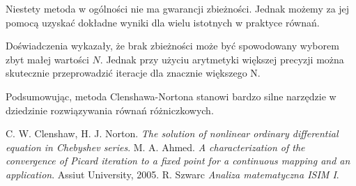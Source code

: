 \documentclass{article}
\begin{document}
\par Niestety metoda w ogólności nie ma gwarancji zbieżności. Jednak możemy za jej pomocą uzyskać dokładne wyniki dla wielu istotnych w praktyce równań. 

\par Doświadczenia wykazały, że brak zbieżności może być spowodowany wyborem zbyt małej wartości $N$. Jednak przy użyciu arytmetyki większej precyzji można skutecznie przeprowadzić iteracje dla znacznie większego N.

\par Podsumowując, metoda Clenshawa-Nortona stanowi bardzo silne narzędzie w dziedzinie rozwiązywania równań różniczkowych.


\begin{thebibliography}{100}
 C. W. Clenshaw, H. J. Norton. \emph{The solution of nonlinear ordinary differential equation in Chebyshev series}. 
 M. A. Ahmed. \emph{A characterization of the convergence of Picard iteration to a fixed point for a continuous mapping and an application}. Assiut University, 2005.
 R. Szwarc \emph{Analiza matematyczna ISIM I}.
\end{thebibliography}
\end{document}
